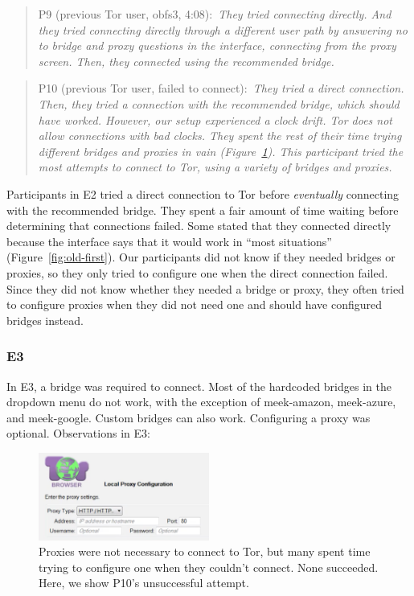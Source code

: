 \documentclass[USenglish,oneside,twocolumn]{article}
\newcommand{\pquote}[2]{
\begin{quotation}
\noindent #1:~\textit{#2}
\end{quotation}
}
\begin{document}
\pquote{P9 (previous Tor user, obfs3, 4:08)}{They tried connecting directly. And they tried connecting directly through a different user path by answering no to bridge and proxy questions in the interface, connecting from the proxy screen. Then, they connected using the recommended bridge.}

\pquote{P10 (previous Tor user, failed to connect)}{They tried a direct connection. Then, they tried a connection with the recommended bridge, which should have worked. However, our setup experienced a clock drift. Tor does not allow connections with bad clocks. They spent the rest of their time trying different bridges and proxies in vain (Figure~\ref{fig:proxy-attempt}). This participant tried the most attempts to connect to Tor, using a variety of bridges and proxies.}

Participants in E2 tried a direct connection to Tor before {\it eventually} connecting with the recommended bridge.
They spent a fair amount of time waiting before determining that connections failed. Some stated that they connected directly because the interface says that it would work in ``most situations'' (Figure~\ref{fig:old-first}). Our participants did not know if they needed bridges or proxies, so they only tried to configure one when the direct connection failed. Since they did not know whether they needed a bridge or proxy, they often tried to configure proxies when they did not need one and should have configured bridges instead.  

\subsubsection{E3}
In E3, a bridge was required to connect. Most of the hardcoded bridges in the dropdown menu do not work, with the exception of meek-amazon, meek-azure, and meek-google. Custom bridges can also work. Configuring a proxy was optional.
Observations in E3: 

\begin{figure}[t]
\centering
\includegraphics[width=0.5\textwidth]{P8-proxy-attempt.png}
\caption{
Proxies were not necessary to connect to Tor, but many spent time trying to configure one when they couldn't connect. None succeeded. Here, we show P10's unsuccessful attempt. 
}
\label{fig:proxy-attempt}
\end{figure}
\end{document}

